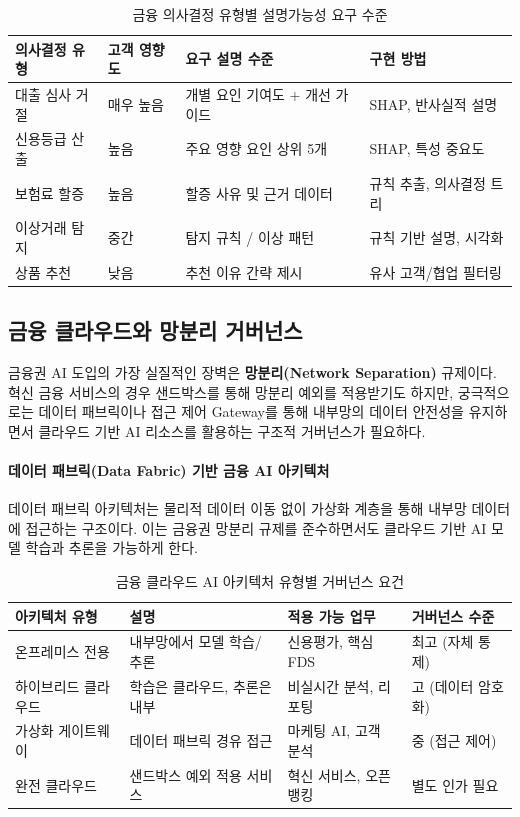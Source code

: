 \begin{table}[htbp]
\centering
\caption{금융 의사결정 유형별 설명가능성 요구 수준}
\label{tab:17_3}
\begin{tabularx}{\textwidth}{p{3cm}p{2cm}Xp{3.5cm}}
\toprule
\textbf{의사결정 유형} & \textbf{고객 영향도} & \textbf{요구 설명 수준} & \textbf{구현 방법} \\
\midrule
대출 심사 거절 & 매우 높음 & 개별 요인 기여도 + 개선 가이드 & SHAP, 반사실적 설명 \\
신용등급 산출 & 높음 & 주요 영향 요인 상위 5개 & SHAP, 특성 중요도 \\
보험료 할증 & 높음 & 할증 사유 및 근거 데이터 & 규칙 추출, 의사결정 트리 \\
이상거래 탐지 & 중간 & 탐지 규칙 / 이상 패턴 & 규칙 기반 설명, 시각화 \\
상품 추천 & 낮음 & 추천 이유 간략 제시 & 유사 고객/협업 필터링 \\
\bottomrule
\end{tabularx}
\end{table}

\subsection{금융 클라우드와 망분리 거버넌스}
\label{sec:17.1.4}

금융권 AI 도입의 가장 실질적인 장벽은 \textbf{망분리(Network Separation)} 규제이다. 혁신 금융 서비스의 경우 샌드박스를 통해 망분리 예외를 적용받기도 하지만, 궁극적으로는 데이터 패브릭이나 접근 제어 Gateway를 통해 내부망의 데이터 안전성을 유지하면서 클라우드 기반 AI 리소스를 활용하는 구조적 거버넌스가 필요하다.

\paragraph{데이터 패브릭(Data Fabric) 기반 금융 AI 아키텍처}

데이터 패브릭 아키텍처는 물리적 데이터 이동 없이 가상화 계층을 통해 내부망 데이터에 접근하는 구조이다. 이는 금융권 망분리 규제를 준수하면서도 클라우드 기반 AI 모델 학습과 추론을 가능하게 한다.

\begin{table}[htbp]
\centering
\caption{금융 클라우드 AI 아키텍처 유형별 거버넌스 요건}
\label{tab:17_cloud_arch}
\begin{tabularx}{\textwidth}{p{2.5cm}Xp{3cm}p{2.5cm}}
\toprule
\textbf{아키텍처 유형} & \textbf{설명} & \textbf{적용 가능 업무} & \textbf{거버넌스 수준} \\
\midrule
온프레미스 전용 & 내부망에서 모델 학습/추론 & 신용평가, 핵심 FDS & 최고 (자체 통제) \\
하이브리드 클라우드 & 학습은 클라우드, 추론은 내부 & 비실시간 분석, 리포팅 & 고 (데이터 암호화) \\
가상화 게이트웨이 & 데이터 패브릭 경유 접근 & 마케팅 AI, 고객 분석 & 중 (접근 제어) \\
완전 클라우드 & 샌드박스 예외 적용 서비스 & 혁신 서비스, 오픈뱅킹 & 별도 인가 필요 \\
\bottomrule
\end{tabularx}
\end{table}

